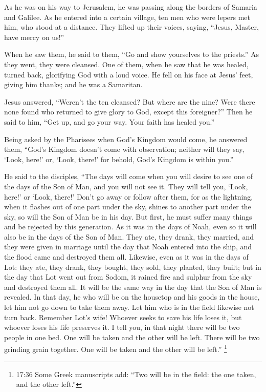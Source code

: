  As he was on his way to Jerusalem, he was passing along
the borders of Samaria and Galilee.  As he entered into a
certain village, ten men who were lepers met him, who stood at a
distance.  They lifted up their voices, saying, ``Jesus,
Master, have mercy on us!''

 When he saw them, he said to them, ``Go and show
yourselves to the priests.'' As they went, they were cleansed.
 One of them, when he saw that he was healed, turned back,
glorifying God with a loud voice.  He fell on his face at
Jesus' feet, giving him thanks; and he was a Samaritan.

 Jesus answered, ``Weren't the ten cleansed? But where are
the nine?  Were there none found who returned to give glory
to God, except this foreigner?''  Then he said to him,
``Get up, and go your way. Your faith has healed you.''

 Being asked by the Pharisees when God's Kingdom would
come, he answered them, ``God's Kingdom doesn't come with observation;
 neither will they say, `Look, here!' or, `Look, there!'
for behold, God's Kingdom is within you.''

 He said to the disciples, ``The days will come when you
will desire to see one of the days of the Son of Man, and you will not
see it.  They will tell you, `Look, here!' or `Look,
there!' Don't go away or follow after them,  for as the
lightning, when it flashes out of one part under the sky, shines to
another part under the sky, so will the Son of Man be in his day.
 But first, he must suffer many things and be rejected by
this generation.  As it was in the days of Noah, even so it
will also be in the days of the Son of Man.  They ate, they
drank, they married, and they were given in marriage until the day that
Noah entered into the ship, and the flood came and destroyed them all.
 Likewise, even as it was in the days of Lot: they ate,
they drank, they bought, they sold, they planted, they built;
 but in the day that Lot went out from Sodom, it rained
fire and sulphur from the sky and destroyed them all.  It
will be the same way in the day that the Son of Man is revealed.
 In that day, he who will be on the housetop and his goods
in the house, let him not go down to take them away. Let him who is in
the field likewise not turn back.  Remember Lot's wife!
 Whoever seeks to save his life loses it, but whoever loses
his life preserves it.  I tell you, in that night there
will be two people in one bed. One will be taken and the other will be
left.  There will be two grinding grain together. One will
be taken and the other will be left.''  \footnote{17:36
  Some Greek manuscripts add: ``Two will be in the field: the one taken,
  and the other left.''}

